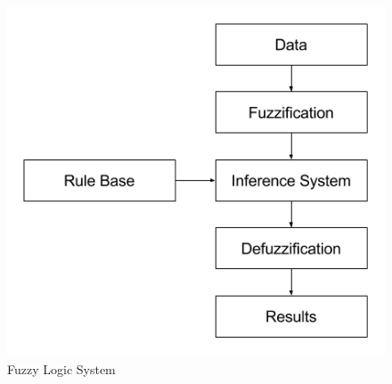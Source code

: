 \documentclass[conference]{IEEEtran}
\begin{document}
\begin{figure}[h!]
\centering
\captionsetup{justification=centering}
\noindent \includegraphics[scale=0.6]{fig1}
\caption{Fuzzy Logic System}
\end{figure}


%
%

\end{document}
